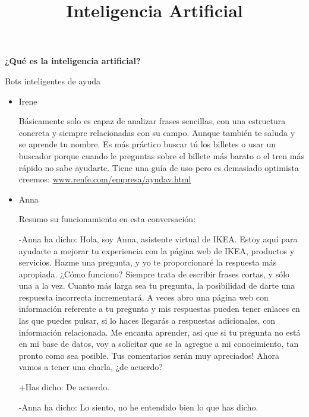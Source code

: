 \documentclass[spanish, a4paper, 12pt]{article} 	%
\begin{document}
\title{\textbf{Inteligencia Artificial}}
\maketitle



\newpage
\textbf{{¿Qué es la inteligencia artificial?}}


\begin{section}{Bots inteligentes de ayuda}

	\begin{itemize}
	
	\item{Irene}
	
	Básicamente solo es capaz de analizar frases sencillas, con una estructura concreta y siempre relacionadas con su campo.
	 Aunque también te saluda y se aprende tu nombre. Es más práctico buscar tú los billetes o usar un buscador porque 
	 cuando le preguntas sobre el billete más barato o el tren más rápido no sabe ayudarte.
	 Tiene una guía de uso pero es demasiado optimista creemos: \url{www.renfe.com/empresa/ayudav.html}
	 
	\item{Anna}
	
	Resumo su funcionamiento en esta conversación:
	
	-Anna ha dicho: Hola, soy Anna, asistente virtual de IKEA. Estoy aquí para ayudarte a mejorar tu experiencia con la página 		web de IKEA, productos y servicios. Hazme una pregunta, y yo te proporcionaré la respuesta más apropiada. 
¿Cómo funciono? Siempre trata de escribir frases cortas, y sólo una a la vez. Cuanto más larga sea tu pregunta, la posibilidad de darte una respuesta incorrecta incrementará. A veces abro una página web con información referente a tu pregunta y mis respuestas pueden tener enlaces en las que puedes pulsar, si lo haces llegarás a respuestas adicionales, con información relacionada. Me encanta aprender, así que si tu pregunta no está en mi base de datos, voy a solicitar que se la agregue a mi conocimiento, tan pronto como sea posible. Tus comentarios serán muy apreciados! Ahora vamos a tener una charla, ¿de acuerdo?

	+Has dicho: De acuerdo.
	
	-Anna ha dicho: Lo siento, no he entendido bien lo que has dicho.
	

\end{itemize}
\end{section}
\end{document}
